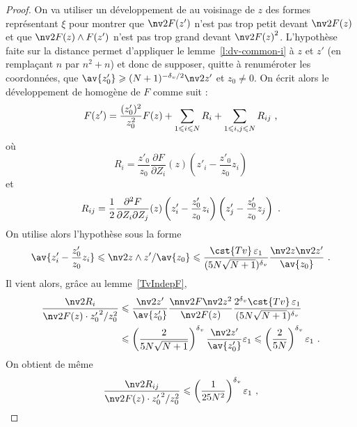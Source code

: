 \begin{proof}
  On va utiliser un développement de  au voisinage de \( z \) des
  formes représentant \( \xi \) pour montrer que \( \nv2{F(z')} \) n'est pas
  trop petit devant \( \nv2 {F(z)} \) et que \( \nv2{F(z) \wedge F(z')} \)
  n'est pas trop grand devant \( \nv2 {F(z)}^2 \). L'hypothèse faite sur la
  distance permet d'appliquer le lemme~\ref{l:dv-common-i} à \( z \) et \( z'
  \) (en remplaçant \( n \) par \( n^2 + n \)) et donc de supposer, quitte à
  renuméroter les coordonnées, que \( \av{z'_0} \ge (N+1)^{-\dv/2}\nv2{z'} \)
  et \( z_0 \neq 0 \). On écrit alors le développement de 
  homogène de \( F \) comme suit :
  \begin{equation}
    F(z')
    =
    \frac{ (z'_0)^2 }{ z_0^2 } F(z)
    + \sum_{1 \leqslant i \leqslant N} R_i
    + \sum_{1 \leqslant i, j \leqslant N} R_{ij}
    \text{ ,}
  \end{equation}
  où
  \begin{equation}
    R_i
    =
    \frac{z'_0}{z_0} \frac{\partial F}{\partial Z_i}(z)
    \left( z'_i - \frac{z'_0}{z_0} z_i \right)
  \end{equation}
  et
  \begin{equation}
    R_{ij}
    =
    \frac12 \frac{ \partial^2 F }{ \partial Z_i \partial Z_j }(z)
    \left( z'_i - \frac{z'_0}{z_0} z_i \right)
    \left( z'_j - \frac{z'_0}{z_0} z_j \right)
    \text{ .}
  \end{equation}
  On utilise alors l'hypothèse sous la forme
  \begin{equation}
    \av{z'_i - \frac{z'_0}{z_0} z_i}
    \le
    \nv2{z \wedge z'} / \av{z_0}
    \le
    \frac{\cst{Tv}\,\eps_1}{(5N\sqrt{N+1})^\dv}
    \frac{\nv2 z \nv2{z'}}{\av{z_0}}
    \pmm.
  \end{equation}
  Il vient alors, grâce au lemme~\ref{TvIndepF},
  \begin{align*}
    \frac{ \nv2{R_i} }{ \nv2{F(z) \cdot {z_0'}^2/z_0^2} }
    & \le
    \frac{ \nv2{z'} }{ \av{z'_0} }
    \frac{ \nnv2{F} \nv2 z^2 }{ \nv2{F(z)} }
    \frac{ 2^\dv \cst{Tv}\,\eps_1 }{ (5N\sqrt{N+1})^\dv }
    \\ & \le
    \left( \frac2{ 5N\sqrt{N+1} } \right)^\dv
    \frac{ \nv2{z'} }{ \av{z'_0} } \eps_1
    \le
    \left( \frac2{5N} \right)^\dv \eps_1
    \pmm.
  \end{align*}
  On obtient de même
  \begin{equation}
    \frac{ \nv2{R_{ij}} }{ \nv2{F(z) \cdot {z_0'}^2/z_0^2} }
    \le
    \left( \frac1{25N^2} \right)^\dv \eps_1
    \pmm,
  \end{equation}

\end{proof}
